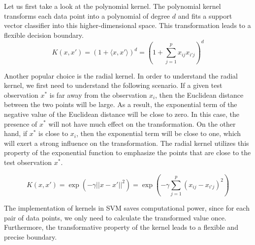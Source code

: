 Let us first take a look at the polynomial kernel. The polynomial kernel transforms each data point into a polynomial
of degree $d$ and fits a support vector classifier into this higher-dimensional space. This 
transformation leads to a flexible decision boundary. 
\begin{equation}
    K(x, x') = (1 + \langle x, x' \rangle)^d = (1 + \sum_{j=1}^px_{ij}x_{i'j})^d
\end{equation}

Another popular choice is the radial kernel. In order to understand the radial kernel, we first need to understand
the following scenario.
If a given test observation $x^*$ is far away from the observation $x_i$,
then the Euclidean distance between the two points will be large.
As a result, the exponential term of the negative value of the Euclidean distance will be close to zero.
In this case, the presence of $x^*$ will not have much effect on the transformation.
On the other hand, if $x^*$ is close to $x_i$, then the exponential term will be close to one, which
will exert a strong influence on the transformation. The radial kernel utilizes this property of the
exponential function to emphasize the points that are close to the test observation $x^*$.

\begin{equation}
    K(x, x') = \exp(-\gamma ||x - x'||^2) = \exp(-\gamma \sum_{j=1}^p(x_{ij} - x_{i'j})^2)
\end{equation}

The implementation of kernels in SVM saves computational power, since for each pair of data points, we
only need to calculate the transformed value once. Furthermore, the transformative property of the
kernel leads to a flexible and precise boundary.
